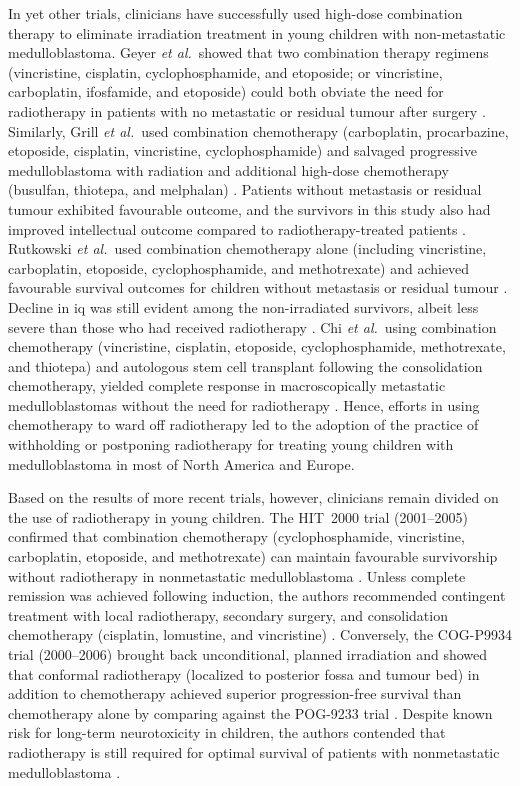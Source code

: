 In yet other trials, clinicians have successfully used high-dose combination therapy to eliminate irradiation treatment in young children with non-metastatic medulloblastoma. Geyer \emph{et al.}\ showed that two combination therapy regimens (vincristine, cisplatin, cyclophosphamide, and etoposide; or vincristine, carboplatin, ifosfamide, and etoposide) could both obviate the need for radiotherapy in patients with no metastatic or residual tumour after surgery .  Similarly, Grill \emph{et al.}\ used combination chemotherapy (carboplatin, procarbazine, etoposide, cisplatin, vincristine, cyclophosphamide) and salvaged progressive medulloblastoma with radiation and additional high-dose chemotherapy (busulfan, thiotepa, and melphalan) . Patients without metastasis or residual tumour exhibited favourable outcome, and the survivors in this study also had improved intellectual outcome compared to radiotherapy-treated patients . Rutkowski \emph{et al.}\ used combination chemotherapy alone (including vincristine, carboplatin, etoposide, cyclophosphamide, and methotrexate) and achieved favourable survival outcomes for children without metastasis or residual tumour . Decline in \gls{iq} was still evident among the non-irradiated survivors, albeit less severe than those who had received radiotherapy . Chi \emph{et al.}\ using combination chemotherapy (vincristine, cisplatin, etoposide, cyclophosphamide, methotrexate, and thiotepa) and autologous stem cell transplant following the consolidation chemotherapy, yielded complete response in macroscopically metastatic medulloblastomas without the need for radiotherapy . Hence, efforts in using chemotherapy to ward off radiotherapy led to the adoption of the practice of withholding or postponing radiotherapy for treating young children with medulloblastoma in most of North America and Europe.

Based on the results of more recent trials, however, clinicians remain divided on the use of radiotherapy in young children. The HIT~2000 trial (2001--2005) confirmed that combination chemotherapy (cyclophosphamide, vincristine, carboplatin, etoposide, and methotrexate) can maintain favourable survivorship without radiotherapy in nonmetastatic medulloblastoma . Unless complete remission was achieved following induction, the authors recommended contingent treatment with local radiotherapy, secondary surgery, and consolidation chemotherapy (cisplatin, lomustine, and vincristine) . Conversely, the COG-P9934 trial (2000--2006) brought back unconditional, planned irradiation and showed that conformal radiotherapy (localized to posterior fossa and tumour bed) in addition to chemotherapy achieved superior progression-free survival than chemotherapy alone by comparing against the POG-9233 trial . Despite known risk for long-term neurotoxicity in children, the authors contended that radiotherapy is still required for optimal survival of patients with nonmetastatic medulloblastoma .

